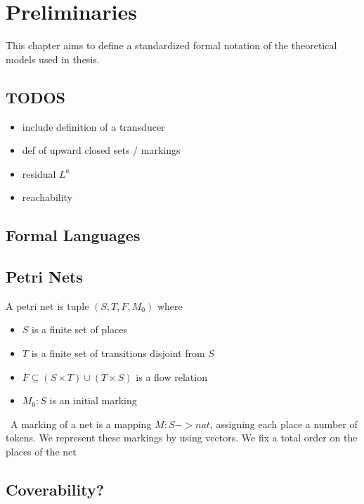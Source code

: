 \chapter{Preliminaries}\label{chapter:preliminaries}
This chapter aims to define a standardized formal notation of the theoretical models used in thesis.

\section{TODOS}
\begin{itemize}
\item include definition of a transducer 
\item def of upward closed sets / markings
\item residual $L^{a}$
\item reachability


\end{itemize}

\section{Formal Languages}

\section{Petri Nets}
A petri net is tuple $(S,T,F,M_{0})$ where 
\begin{itemize}
	\item $S$ is a finite set of places 
	\item $T$ is a finite set of transitions disjoint from $S$
	\item $F \subseteq (S \times T) \cup (T \times S)$ is a flow relation 
	\item $M_{0}: S $ is an initial marking 
\end{itemize}
\
A marking of a net is a mapping $M : S -> nat$, assigning each place a number of tokens. We represent these markings by using vectors. We fix a total order on the places of the net 


\section{Coverability?}